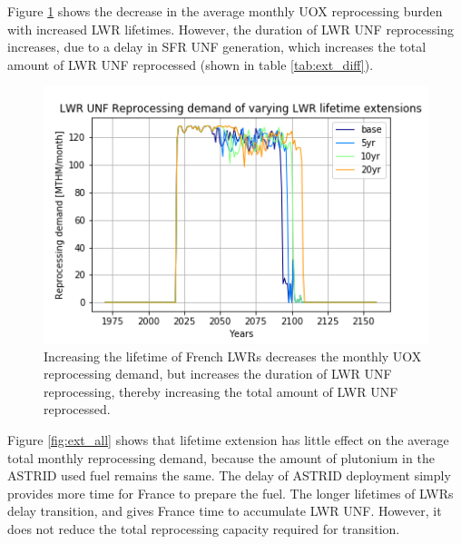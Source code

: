 Figure \ref{fig:ext_uox} shows the decrease in the average monthly
\gls{UOX} reprocessing burden with increased \gls{LWR} lifetimes.
However, the duration of \gls{LWR} \gls{UNF} reprocessing increases,
due to a delay in \gls{SFR} \gls{UNF} generation, which increases
the total amount of \gls{LWR} \gls{UNF} reprocessed (shown in table
\ref{tab:ext_diff}).


\begin{figure}[htbp!]
	\begin{center}
		\includegraphics[scale=0.7]{./images/sensitivity/ext_uox_rep.png}
	\end{center}
	\caption{Increasing the lifetime of French \glspl{LWR} decreases the monthly
		\gls{UOX} reprocessing demand, but increases the duration of \gls{LWR} \gls{UNF}
		reprocessing, thereby increasing the total amount of \gls{LWR} \gls{UNF} reprocessed.}
	\label{fig:ext_uox}
\end{figure}

Figure \ref{fig:ext_all} shows that lifetime extension has little
effect on the average total monthly reprocessing demand, because
the amount of plutonium in the \gls{ASTRID} used fuel remains the same.
The delay of \gls{ASTRID} deployment simply provides more time for
France to prepare the fuel. 
The longer lifetimes of \glspl{LWR} delay transition, and gives France
time to accumulate \gls{LWR} \gls{UNF}. However, it does not reduce
the total reprocessing capacity required for transition.



